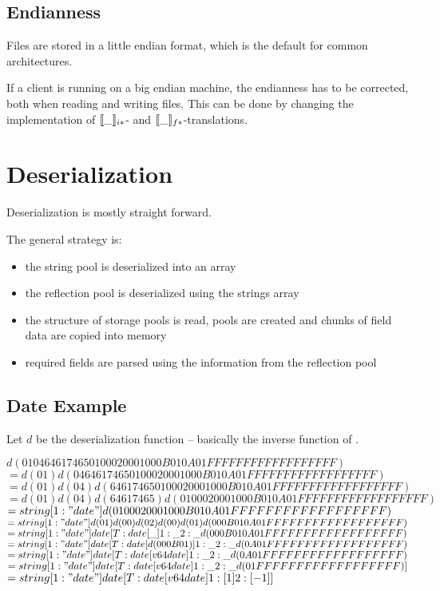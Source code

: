 \subsection{Endianness}

Files are stored in a little endian format, which is the default for common architectures.

If a client is running on a big endian machine, the endianness has to be corrected, both when reading and writing files. This can be done by changing the implementation of $[\![\_]\!]_{i*}$- and $[\![\_]\!]_{f*}$-translations.



\section{Deserialization}

Deserialization is mostly straight forward.

The general strategy is:
\begin{itemize}
 \item the string pool is deserialized into an array
 \item the reflection pool is deserialized using the strings array
 \item the structure of storage pools is read, pools are created and chunks of field data are copied into memory
 \item required fields are parsed using the information from the reflection pool
\end{itemize}

\subsection*{Date Example}

Let $d$ be the deserialization function -- basically the inverse function of \den{\_}.

$d(01 04 64 61  74 65 01 00  02 00 01 00  0B 01 0A 01   FF FF FF FF  FF FF FF FF  FF)$\\
$=d(01) d(04 64 61  74 65 01 00  02 00 01 00  0B 01 0A 01   FF FF FF FF  FF FF FF FF  FF)$\\
$=d(01) d(04) d(64 61  74 65 01 00  02 00 01 00  0B 01 0A 01   FF FF FF FF  FF FF FF FF  FF)$
$=d(01) d(04) d(64 61  74 65) d(01 00  02 00 01 00  0B 01 0A 01   FF FF FF FF  FF FF FF FF  FF)$
$=string[1:"date"] d(01 00  02 00 01 00  0B 01 0A 01   FF FF FF FF  FF FF FF FF  FF)$
$=string[1:"date"] d(01) d(00) d(02) d(00) d(01) d(00  0B 01 0A 01   FF FF FF FF  FF FF FF FF  FF)$
$=string[1:"date"] date[T:date[\_] 1:\_ 2:\_ d(00  0B 01 0A 01   FF FF FF FF  FF FF FF FF  FF)$
$=string[1:"date"] date[T:date[d(00  0B 01)] 1:\_ 2:\_ d(0A 01   FF FF FF FF  FF FF FF FF  FF)$
$=string[1:"date"] date[T:date[v64 date] 1:\_ 2:\_ d(0A 01   FF FF FF FF  FF FF FF FF  FF)$
$=string[1:"date"] date[T:date[v64 date] 1:\_ 2:\_ d(01   FF FF FF FF  FF FF FF FF  FF)]$
$=string[1:"date"] date[T:date[v64 date] 1:[1] 2:[-1]]$